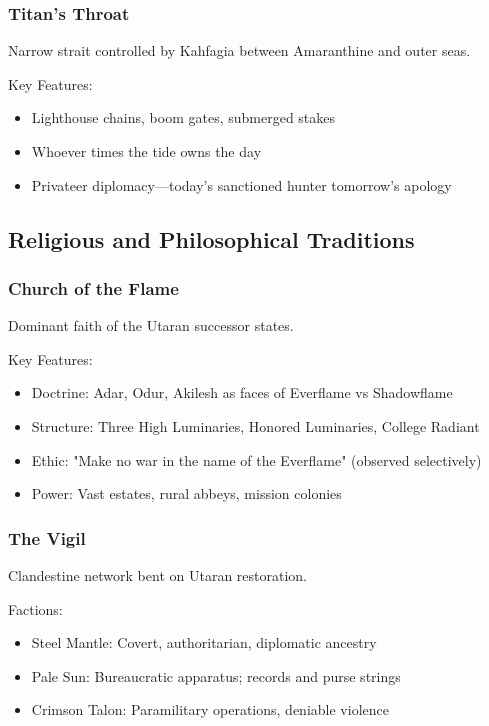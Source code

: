 \subsubsection{Titan's Throat}
\label{sec:titansthroat}

Narrow strait controlled by Kahfagia between Amaranthine and outer seas.

Key Features:
\begin{itemize}
    \item Lighthouse chains, boom gates, submerged stakes
    \item Whoever times the tide owns the day
    \item Privateer diplomacy—today's sanctioned hunter tomorrow's apology
\end{itemize}

\subsection{Religious and Philosophical Traditions}

\subsubsection{Church of the Flame}
\label{sec:churchofflame}

Dominant faith of the Utaran successor states.

Key Features:
\begin{itemize}
    \item Doctrine: Adar, Odur, Akilesh as faces of Everflame vs Shadowflame
    \item Structure: Three High Luminaries, Honored Luminaries, College Radiant
    \item Ethic: "Make no war in the name of the Everflame" (observed selectively)
    \item Power: Vast estates, rural abbeys, mission colonies
\end{itemize}

\subsubsection{The Vigil}
\label{sec:thevigil}

Clandestine network bent on Utaran restoration.

Factions:
\begin{itemize}
    \item Steel Mantle: Covert, authoritarian, diplomatic ancestry
    \item Pale Sun: Bureaucratic apparatus; records and purse strings
    \item Crimson Talon: Paramilitary operations, deniable violence
\end{itemize}

